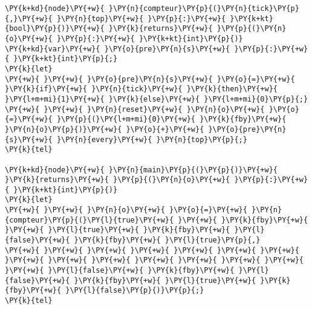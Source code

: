\begin{Verbatim}[commandchars=\\\{\}]
\PY{k+kd}{node}\PY{+w}{ }\PY{n}{compteur}\PY{p}{(}\PY{n}{tick}\PY{p}{,}\PY{+w}{ }\PY{n}{top}\PY{+w}{ }\PY{p}{:}\PY{+w}{ }\PY{k+kt}{bool}\PY{p}{)}\PY{+w}{ }\PY{k}{returns}\PY{+w}{ }\PY{p}{(}\PY{n}{o}\PY{+w}{ }\PY{p}{:}\PY{+w}{ }\PY{k+kt}{int}\PY{p}{)}
\PY{k+kd}{var}\PY{+w}{ }\PY{o}{pre}\PY{n}{s}\PY{+w}{ }\PY{p}{:}\PY{+w}{ }\PY{k+kt}{int}\PY{p}{;}
\PY{k}{let}
\PY{+w}{ }\PY{+w}{ }\PY{o}{pre}\PY{n}{s}\PY{+w}{ }\PY{o}{=}\PY{+w}{ }\PY{k}{if}\PY{+w}{ }\PY{n}{tick}\PY{+w}{ }\PY{k}{then}\PY{+w}{ }\PY{l+m+mi}{1}\PY{+w}{ }\PY{k}{else}\PY{+w}{ }\PY{l+m+mi}{0}\PY{p}{;}
\PY{+w}{ }\PY{+w}{ }\PY{n}{reset}\PY{+w}{ }\PY{n}{o}\PY{+w}{ }\PY{o}{=}\PY{+w}{ }\PY{p}{(}\PY{l+m+mi}{0}\PY{+w}{ }\PY{k}{fby}\PY{+w}{ }\PY{n}{o}\PY{p}{)}\PY{+w}{ }\PY{o}{+}\PY{+w}{ }\PY{o}{pre}\PY{n}{s}\PY{+w}{ }\PY{n}{every}\PY{+w}{ }\PY{n}{top}\PY{p}{;}
\PY{k}{tel}

\PY{k+kd}{node}\PY{+w}{ }\PY{n}{main}\PY{p}{(}\PY{p}{)}\PY{+w}{ }\PY{k}{returns}\PY{+w}{ }\PY{p}{(}\PY{n}{o}\PY{+w}{ }\PY{p}{:}\PY{+w}{ }\PY{k+kt}{int}\PY{p}{)}
\PY{k}{let}
\PY{+w}{ }\PY{+w}{ }\PY{n}{o}\PY{+w}{ }\PY{o}{=}\PY{+w}{ }\PY{n}{compteur}\PY{p}{(}\PY{l}{true}\PY{+w}{ }\PY{+w}{ }\PY{k}{fby}\PY{+w}{ }\PY{+w}{ }\PY{l}{true}\PY{+w}{ }\PY{k}{fby}\PY{+w}{ }\PY{l}{false}\PY{+w}{ }\PY{k}{fby}\PY{+w}{ }\PY{l}{true}\PY{p}{,}
\PY{+w}{ }\PY{+w}{ }\PY{+w}{ }\PY{+w}{ }\PY{+w}{ }\PY{+w}{ }\PY{+w}{ }\PY{+w}{ }\PY{+w}{ }\PY{+w}{ }\PY{+w}{ }\PY{+w}{ }\PY{+w}{ }\PY{+w}{ }\PY{+w}{ }\PY{l}{false}\PY{+w}{ }\PY{k}{fby}\PY{+w}{ }\PY{l}{false}\PY{+w}{ }\PY{k}{fby}\PY{+w}{ }\PY{l}{true}\PY{+w}{ }\PY{k}{fby}\PY{+w}{ }\PY{l}{false}\PY{p}{)}\PY{p}{;}
\PY{k}{tel}
\end{Verbatim}
